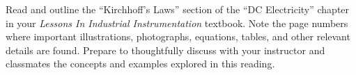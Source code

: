 

Read and outline the ``Kirchhoff's Laws'' section of the ``DC Electricity'' chapter in your {\it Lessons In Industrial Instrumentation} textbook.  Note the page numbers where important illustrations, photographs, equations, tables, and other relevant details are found.  Prepare to thoughtfully discuss with your instructor and classmates the concepts and examples explored in this reading.

















